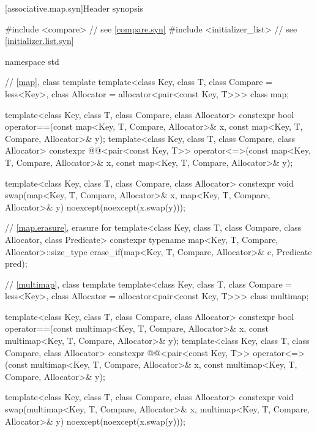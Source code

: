[associative.map.syn]{Header  synopsis}

%
\begin{codeblock}
#include <compare>              // see \ref{compare.syn}
#include <initializer_list>     // see \ref{initializer.list.syn}

namespace std {
  // \ref{map}, class template 
  template<class Key, class T, class Compare = less<Key>,
           class Allocator = allocator<pair<const Key, T>>>
    class map;

  template<class Key, class T, class Compare, class Allocator>
    constexpr bool operator==(const map<Key, T, Compare, Allocator>& x,
                              const map<Key, T, Compare, Allocator>& y);
  template<class Key, class T, class Compare, class Allocator>
    constexpr @@<pair<const Key, T>>
      operator<=>(const map<Key, T, Compare, Allocator>& x,
                  const map<Key, T, Compare, Allocator>& y);

  template<class Key, class T, class Compare, class Allocator>
    constexpr void swap(map<Key, T, Compare, Allocator>& x,
                        map<Key, T, Compare, Allocator>& y)
      noexcept(noexcept(x.swap(y)));

  // \ref{map.erasure}, erasure for 
  template<class Key, class T, class Compare, class Allocator, class Predicate>
    constexpr typename map<Key, T, Compare, Allocator>::size_type
      erase_if(map<Key, T, Compare, Allocator>& c, Predicate pred);

  // \ref{multimap}, class template 
  template<class Key, class T, class Compare = less<Key>,
           class Allocator = allocator<pair<const Key, T>>>
    class multimap;

  template<class Key, class T, class Compare, class Allocator>
    constexpr bool operator==(const multimap<Key, T, Compare, Allocator>& x,
                              const multimap<Key, T, Compare, Allocator>& y);
  template<class Key, class T, class Compare, class Allocator>
    constexpr @@<pair<const Key, T>>
      operator<=>(const multimap<Key, T, Compare, Allocator>& x,
                  const multimap<Key, T, Compare, Allocator>& y);

  template<class Key, class T, class Compare, class Allocator>
    constexpr void swap(multimap<Key, T, Compare, Allocator>& x,
              multimap<Key, T, Compare, Allocator>& y)
      noexcept(noexcept(x.swap(y)));

}
\end{codeblock}
